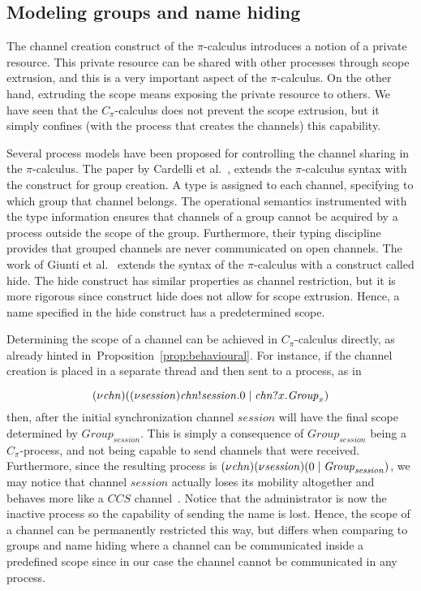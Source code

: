 \subsection{Modeling groups and name hiding}\label{sec:groups}


The channel creation construct of the $\pi$-calculus introduces a notion of a private resource. %
This private resource can be shared with other processes through scope extrusion, and this is a very important aspect of the $\pi$-calculus. On the other hand, extruding the scope means exposing the private resource to others. We have seen that the $C_\pi$-calculus does not prevent the scope extrusion, but it simply confines (with the process that creates the channels) this capability. 

Several process models have been proposed for controlling the channel sharing in the $\pi$-calculus. The paper by Cardelli et al.~\cite{cardelli05}, extends the $\pi$-calculus syntax with the construct for group creation. 
A type is assigned to each channel, specifying to which group that channel belongs. 
The operational semantics instrumented with the type information ensures that channels of a group cannot be acquired by a process outside the scope of the group. Furthermore, their typing discipline provides that grouped channels are never communicated on open channels. 
The work of Giunti et al.~\cite{Giunti} extends the syntax of the $\pi$-calculus with a construct called hide. 
The hide construct has similar properties as channel restriction, but it is more rigorous since construct hide does not allow for scope extrusion. Hence, a name specified in the hide construct has a predetermined scope. 

Determining the scope of a channel can be achieved in $C_\pi$-calculus directly, as already hinted in~Proposition~\ref{prop:behavioural}. For instance, if the channel creation is placed in a separate thread and then sent to a process, as in

\[
(\nu \mathit{chn}) 
( (\nu \mathit{session})\mathit{chn}!\mathit{session}.0 \;|\; \mathit{chn}?x.\mathit{Group}_x)
\]
then, after the initial synchronization channel $\mathit{session}$ will have the final scope determined by $\mathit{Group}_\mathit{session}$. 
This is simply a consequence of $\mathit{Group}_\mathit{session}$ being a $C_\pi$-process, and not being capable to send channels that were received. 
Furthermore, since the resulting process is $(\nu \mathit{chn}) 
(\nu \mathit{session})(0 \;|\; \mathit{Group}_\mathit{session})$, we may notice that channel $\mathit{session}$ actually loses its mobility altogether and behaves more like a $CCS$ channel~\cite{DBLP:books/sp/Milner80}. Notice that the administrator is now the inactive process so the capability of sending the name is lost. Hence, the scope of a channel can be permanently restricted this way, but differs when comparing to groups and name hiding where a channel can be communicated inside a predefined scope since in our case the channel cannot be communicated in any process. 

